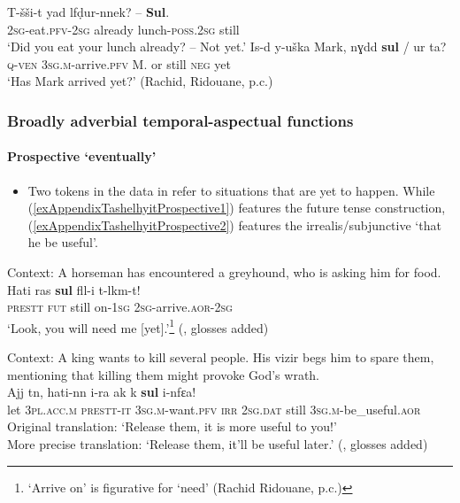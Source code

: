 \begin{exe}
	\ex\label{exAppendixTashelhyitNotYet1}
	\gll T-šši-t yad lfḍur-nnek? – \textbf{Sul}.\\
	2\textsc{sg}-eat.\textsc{pfv}-2\textsc{sg} already lunch-\textsc{poss}.2\textsc{sg} {} still\\
	\glt \lq Did you eat your lunch already? -- Not yet.' \parencite[342]{Fanego2021}
	\ex\label{exAppendixTashelhyitNotYet2}
	\gll Is-d y-uška Mark, nɣdd \textbf{sul} / ur ta?\\
	\textsc{q}-\textsc{ven} 3\textsc{sg}.\textsc{m}-arrive.\textsc{pfv} M. or still {} \textsc{neg} yet\\
	\glt \lq Has Mark arrived yet?' (Rachid, Ridouane, p.c.) 
\end{exe}


\subsubsection{Broadly adverbial temporal-aspectual functions}
\paragraph{Prospective \lq eventually\rq{}}\label{appendixTashelhyitProspective}
\begin{itemize}
	\sloppy
	\item Two tokens in the data in refer to situations that are yet to happen. While (\ref{exAppendixTashelhyitProspective1}) features the future tense construction,  (\ref{exAppendixTashelhyitProspective2}) features the irrealis\slash subjunctive \lq that he be useful\rq{}.
\end{itemize}

\begin{exe}
	\ex\label{exAppendixTashelhyitProspective1}
	Context: A horseman has encountered a greyhound, who is asking him for food.\\ 
	\gll Hati ras \textbf{sul} fll-i	t-lkm-t!\\
	\textsc{prestt} \textsc{fut} still on-1\textsc{sg} 2\textsc{sg}-arrive.\textsc{aor}-2\textsc{sg}\\
	\glt \lq Look, you will need me [yet].'\footnote{\lq Arrive on' is figurative for \lq need' (Rachid Ridouane, p.c.)}  (\cite[66–67]{Stroomer2002}, glosses added)

	\ex\label{exAppendixTashelhyitProspective2}
	Context: A king wants to kill several people. His vizir begs him to spare them, mentioning that killing them might provoke God’s wrath.\\
	\gll Ajj tn, hati-nn i-ra	ak k \textbf{sul} i-nfεa!\\
	let 3\textsc{pl}.\textsc{acc}.\textsc{m} \textsc{prestt}-\textsc{it} 3\textsc{sg}.\textsc{m}-want.\textsc{pfv} \textsc{irr} 2\textsc{sg}.\textsc{dat} still 3\textsc{sg}.\textsc{m}-be\_useful.\textsc{aor}\\
	\glt Original translation: \lq Release them, it is more useful to you!'\\
	More precise translation: \lq Release them, it'll be useful later.\rq{ }(\cite[214–215]{Stroomer2002}, glosses added)
\end{exe}

